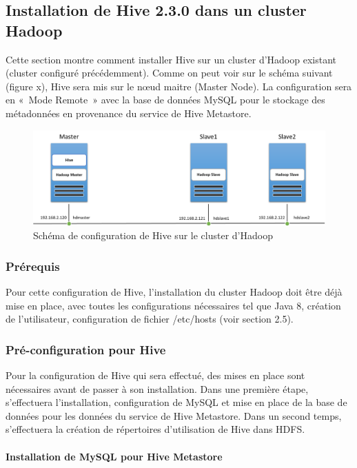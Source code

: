\documentclass[12pt,english]{book}
\begin{document}
\subsection{Installation de Hive 2.3.0 dans un cluster Hadoop}

Cette section montre comment installer Hive sur un cluster d’Hadoop existant (cluster configuré précédemment). Comme on peut voir sur le schéma suivant (figure x), Hive sera mis sur le nœud maitre (Master Node). La configuration sera en « Mode Remote » avec la base de données MySQL pour le stockage des métadonnées en provenance du service de Hive Metastore.

\begin{figure}[H]
	\centering
	\includegraphics[width=\linewidth]{hiveCluster}
	\caption{Schéma de configuration de Hive sur le cluster d'Hadoop}
\end{figure}

\subsubsection{Prérequis}

Pour cette configuration de Hive, l’installation du cluster Hadoop doit être déjà mise en place, avec toutes les configurations nécessaires tel que Java 8, création de l’utilisateur, configuration de fichier /etc/hosts (voir section 2.5).

\subsubsection{Pré-configuration pour Hive}

Pour la configuration de Hive qui sera effectué, des mises en place sont nécessaires avant de passer à son installation.
Dans une première étape, s’effectuera l’installation, configuration de MySQL et mise en place de la base de données pour les données du service de Hive Metastore.
Dans un second temps, s’effectuera la création de répertoires d’utilisation de Hive dans HDFS.

\paragraph{Installation de MySQL pour Hive Metastore}\mbox{}\\
\end{document}

